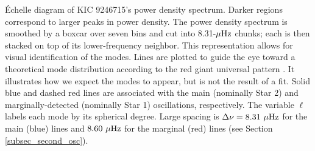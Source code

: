 \label{fig:echelle} \'Echelle diagram of KIC 9246715's power density spectrum. Darker regions correspond to larger peaks in power density. The power density spectrum is smoothed by a boxcar over seven bins and cut into 8.31-$\mu\rm{Hz}$ chunks; each is then stacked on top of its lower-frequency neighbor. This representation allows for visual identification of the modes. Lines are plotted to guide the eye toward a theoretical mode distribution according to the red giant universal pattern \citep{mos11}. It illustrates how we expect the modes to appear, but is not the result of a fit. Solid blue and dashed red lines are associated with the main (nominally Star 2) and marginally-detected (nominally Star 1) oscillations, respectively. The variable $\ell$ labels each mode by its spherical degree. Large spacing is $\Delta\nu = 8.31 \ \mu\rm{Hz}$ for the main (blue) lines and $8.60\ \mu\rm{Hz}$ for the marginal (red) lines (see Section \ref{subsec_second_osc}).